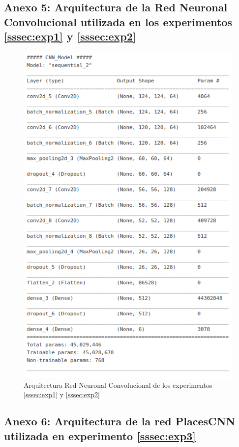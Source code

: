 \subsection{Anexo 5: Arquitectura de la Red Neuronal Convolucional utilizada en los experimentos \ref{sssec:exp1} y \ref{sssec:exp2}}\label{ssec:anexo5}

\begin{figure}[h!]
	\centering
	\includegraphics[width=0.7\linewidth]{images/architecture_exp1_cnn}
	\caption{Arquitectura Red Neuronal Convolucional de los experimentos \ref{sssec:exp1} y \ref{sssec:exp2}}
	\label{fig:architectureexp2}
\end{figure}


\subsection{Anexo 6: Arquitectura de la red PlacesCNN utilizada en experimento \ref{sssec:exp3}}\label{ssec:anexo6}


